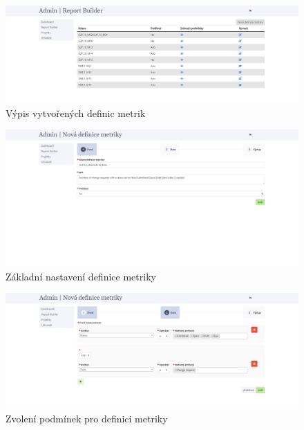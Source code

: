 \documentclass[czech,master]{diploma}
\begin{document}
\begin{figure}[!ht]
    \centering
    \includegraphics[width=1\textwidth]{Diplomka/Figures/metrics_tool/admin_report_builder.jpg}
    \caption{Výpis vytvořených definic metrik}
    \label{fig:admin_report_builder}
\end{figure}

\begin{figure}[!ht]
    \centering
    \includegraphics[width=1\textwidth]{Diplomka/Figures/metrics_tool/admin_report_builder_first.jpg}
    \caption{Základní nastavení definice metriky}
    \label{fig:admin_report_builder_first_first}
\end{figure}

\begin{figure}[!ht]
    \centering
    \includegraphics[width=1\textwidth]{Diplomka/Figures/metrics_tool/admin_report_builder_second.jpg}
    \caption{Zvolení podmínek pro definici metriky}
    \label{fig:admin_report_builder_second}
\end{figure}
\end{document}
